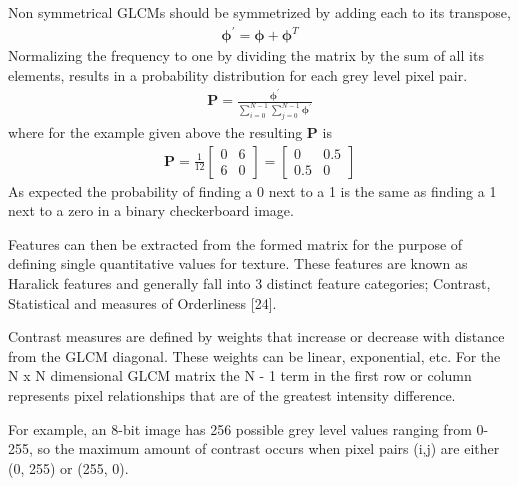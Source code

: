 Non symmetrical GLCMs should be symmetrized by adding each to its transpose,
%
\begin{align}
    \mathbf{\phi}^{'} = \mathbf{\phi} + \mathbf{\phi}^{T}
\end{align}
%
Normalizing the frequency to one by dividing the matrix by the sum of all its elements, results in a probability distribution for each grey level pixel pair.
%
\begin{align}
    \mathbf{P} = \frac{\mathbf{\phi}^{'}}{\sum_{i=0}^{N-1}\sum_{j=0}^{N-1}\mathbf{\phi}^{'}}
\end{align}
%
where for the example given above the resulting $\mathbf{P}$ is
%
\begin{align}
    \mathbf{P} = \frac{1}{12}
    \begin{bmatrix}
        0 & 6 \\
        6 & 0
    \end{bmatrix}
    =
    \begin{bmatrix}
        0 & 0.5 \\
        0.5 & 0
    \end{bmatrix}
\end{align}
%
As expected the probability of finding a 0 next to a 1 is the same as finding a 1 next to a zero in a binary checkerboard image.

Features can then be extracted from the formed matrix for the purpose of defining single quantitative values for texture.  These features are known as Haralick features and generally fall into 3 distinct feature categories; Contrast, Statistical and measures of Orderliness [24].

Contrast measures are defined by weights that increase or decrease with distance from the GLCM diagonal.  These weights can be linear, exponential, etc. For the N x N dimensional GLCM matrix the N - 1 term in the first row or column represents pixel relationships that are of the greatest intensity difference.

For example, an 8-bit image has 256 possible grey level values ranging from 0-255, so the maximum amount of contrast occurs when pixel pairs (i,j) are either (0, 255) or (255, 0).

